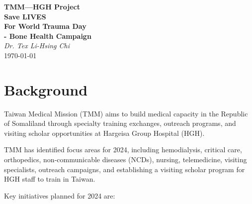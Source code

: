 \documentclass{article}
\begin{document}
%    


\noindent
\begin{minipage}{0.2\textwidth}
\centering

\end{minipage}
\hfill
\begin{minipage}{0.75\textwidth}
\centering
{\LARGE\bfseries TMM---HGH Project \\ 
Save LIVES \\ For World Trauma Day \\
- Bone Health Campaign }\\[1ex]
\large\textit{Dr. Tex Li-Hsing Chi}\\[2ex]
\today
\end{minipage}


\section{Background}
Taiwan Medical Mission (TMM) aims to build medical capacity in the Republic of Somaliland through specialty training exchanges, outreach programs, and visiting scholar opportunities at Hargeisa Group Hospital (HGH).

TMM has identified focus areas for 2024, including hemodialysis, critical care, orthopedics, non-communicable diseases (NCDs), nursing, telemedicine, visiting specialists, outreach campaigns, and establishing a visiting scholar program for HGH staff to train in Taiwan.

Key initiatives planned for 2024 are:
\end{document}

